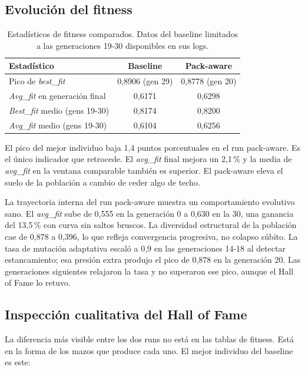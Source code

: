 \subsection{Evolución del fitness}

\begin{table}[H]
\centering
\caption{Estadísticos de fitness comparados. Datos del baseline limitados a las generaciones 19-30 disponibles en sus logs.}
\label{tab:fitness-ab}
\begin{tabular}{lcc}
\toprule
\textbf{Estadístico} & \textbf{Baseline} & \textbf{Pack-aware} \\
\midrule
Pico de \emph{best\_fit} & 0,8906 (gen 29) & 0,8778 (gen 20) \\
\emph{Avg\_fit} en generación final & 0,6171 & 0,6298 \\
\emph{Best\_fit} medio (gens 19-30) & 0,8174 & 0,8200 \\
\emph{Avg\_fit} medio (gens 19-30) & 0,6104 & 0,6256 \\
\bottomrule
\end{tabular}
\end{table}

El pico del mejor individuo baja 1,4 puntos porcentuales en el run pack-aware. Es el único indicador que retrocede. El \emph{avg\_fit} final mejora un 2,1\,\% y la media de \emph{avg\_fit} en la ventana comparable también es superior. El pack-aware eleva el suelo de la población a cambio de ceder algo de techo.

La trayectoria interna del run pack-aware muestra un comportamiento evolutivo sano. El \emph{avg\_fit} sube de 0,555 en la generación 0 a 0,630 en la 30, una ganancia del 13,5\,\% con curva sin saltos bruscos. La diversidad estructural de la población cae de 0,878 a 0,396, lo que refleja convergencia progresiva, no colapso súbito. La tasa de mutación adaptativa escaló a 0,9 en las generaciones 14-18 al detectar estancamiento; esa presión extra produjo el pico de 0,878 en la generación 20. Las generaciones siguientes relajaron la tasa y no superaron ese pico, aunque el Hall of Fame lo retuvo.

\subsection{Inspección cualitativa del Hall of Fame}

La diferencia más visible entre los dos runs no está en las tablas de fitness. Está en la forma de los mazos que produce cada uno. El mejor individuo del baseline es este:

